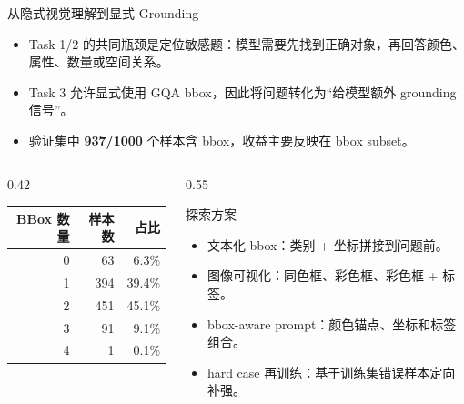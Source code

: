 \documentclass{beamer}
\newcommand{\smalltab}{\scriptsize}
\begin{document}
\begin{frame}[shrink=4]{从隐式视觉理解到显式 Grounding}
\small
\begin{itemize}
\item Task 1/2 的共同瓶颈是定位敏感题：模型需要先找到正确对象，再回答颜色、属性、数量或空间关系。
\item Task 3 允许显式使用 GQA bbox，因此将问题转化为“给模型额外 grounding 信号”。
\item 验证集中 \textbf{937/1000} 个样本含 bbox，收益主要反映在 bbox subset。
\end{itemize}
\begin{columns}[T,onlytextwidth]
\begin{column}{0.42\textwidth}
\smalltab
\begin{tabular}{rrr}
\toprule
BBox 数量 & 样本数 & 占比 \\
\midrule
0 & 63 & 6.3\% \\
1 & 394 & 39.4\% \\
2 & 451 & 45.1\% \\
3 & 91 & 9.1\% \\
4 & 1 & 0.1\% \\
\bottomrule
\end{tabular}
\end{column}
\begin{column}{0.55\textwidth}
\begin{block}{探索方案}
\begin{itemize}
\item 文本化 bbox：类别 + 坐标拼接到问题前。
\item 图像可视化：同色框、彩色框、彩色框 + 标签。
\item bbox-aware prompt：颜色锚点、坐标和标签组合。
\item hard case 再训练：基于训练集错误样本定向补强。
\end{itemize}
\end{block}
\end{column}
\end{columns}
\end{frame}
\end{document}
